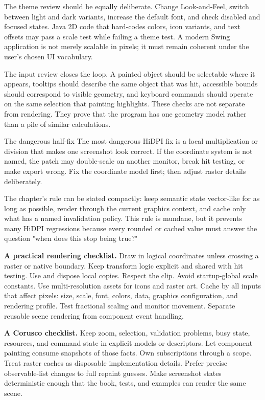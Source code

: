 The theme review should be equally deliberate. Change Look-and-Feel, switch between light and dark variants, increase the default font, and check disabled and focused states. Java 2D code that hard-codes colors, icon variants, and text offsets may pass a scale test while failing a theme test. A modern Swing application is not merely scalable in pixels; it must remain coherent under the user's chosen UI vocabulary.

The input review closes the loop. A painted object should be selectable where it appears, tooltips should describe the same object that was hit, accessible bounds should correspond to visible geometry, and keyboard commands should operate on the same selection that painting highlights. These checks are not separate from rendering. They prove that the program has one geometry model rather than a pile of similar calculations.

\begin{pitfallbox}{The dangerous half-fix}
The most dangerous HiDPI fix is a local multiplication or division that makes one screenshot look correct. If the coordinate system is not named, the patch may double-scale on another monitor, break hit testing, or make export wrong. Fix the coordinate model first; then adjust raster details deliberately.
\end{pitfallbox}

The chapter's rule can be stated compactly: keep semantic state vector-like for as long as possible, render through the current graphics context, and cache only what has a named invalidation policy. This rule is mundane, but it prevents many HiDPI regressions because every rounded or cached value must answer the question "when does this stop being true?"

\textbf{A practical rendering checklist.} Draw in logical coordinates unless crossing a raster or native boundary. Keep transform logic explicit and shared with hit testing. Use  and dispose local copies. Respect the clip. Avoid startup-global scale constants. Use multi-resolution assets for icons and raster art. Cache by all inputs that affect pixels: size, scale, font, colors, data, graphics configuration, and rendering profile. Test fractional scaling and monitor movement. Separate reusable scene rendering from component event handling.

\textbf{A Corusco checklist.} Keep zoom, selection, validation problems, busy state, resources, and command state in explicit models or descriptors. Let component painting consume snapshots of those facts. Own subscriptions through a scope. Treat raster caches as disposable implementation details. Prefer precise observable-list changes to full repaint guesses. Make screenshot states deterministic enough that the book, tests, and examples can render the same scene.

